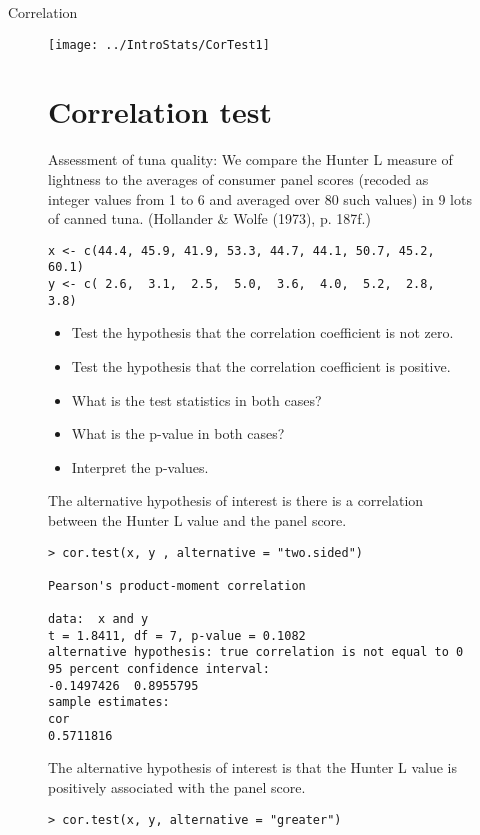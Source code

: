 

{Correlation}
\vspace{-0.5cm}
\begin{figure}
\centering
\texttt{[image: ../IntroStats/CorTest1]}
\section{Correlation test}

Assessment of tuna quality: We compare the Hunter L measure of
lightness to the averages of consumer panel scores (recoded as
integer values from 1 to 6 and averaged over 80 such values) in
9 lots of canned tuna.
(Hollander \& Wolfe (1973), p. 187f.)

\begin{verbatim}
x <- c(44.4, 45.9, 41.9, 53.3, 44.7, 44.1, 50.7, 45.2, 60.1)
y <- c( 2.6,  3.1,  2.5,  5.0,  3.6,  4.0,  5.2,  2.8,  3.8)
\end{verbatim}

\begin{itemize}

\item Test the hypothesis that the correlation coefficient is not zero.
\item Test the hypothesis that the correlation coefficient is positive.
\item What is the test statistics in both cases?
\item What is the p-value in both cases?
\item Interpret the p-values.
\end{itemize}


The alternative hypothesis of interest is there is a correlation between the
Hunter L value and the panel score.

\begin{verbatim}
> cor.test(x, y , alternative = "two.sided")

Pearson's product-moment correlation

data:  x and y
t = 1.8411, df = 7, p-value = 0.1082
alternative hypothesis: true correlation is not equal to 0
95 percent confidence interval:
-0.1497426  0.8955795
sample estimates:
cor
0.5711816

\end{verbatim}


The alternative hypothesis of interest is that the
Hunter L value is positively associated with the panel score.
\begin{verbatim}
> cor.test(x, y, alternative = "greater")


\end{verbatim}
\end{figure}
